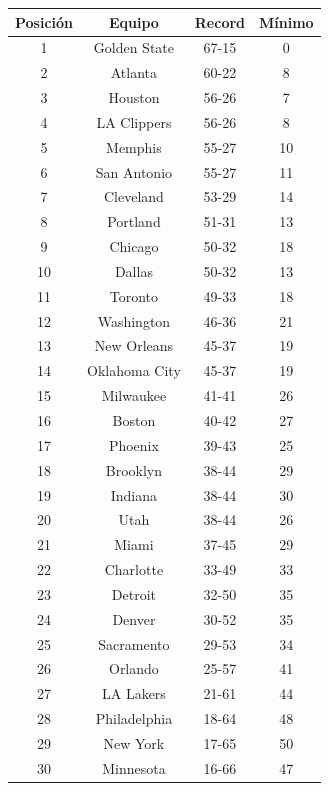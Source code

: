 {\centering
\begin{tabular}{|c|c|c|c|}
\hline
Posici\'on & Equipo & Record & M\'inimo\\
\hline
1 & Golden State & 67-15 & 0 \\
\hline
2 & Atlanta & 60-22 & 8 \\
\hline
3 & Houston & 56-26 & 7 \\
\hline
4 & LA Clippers & 56-26 & 8 \\
\hline
5 & Memphis & 55-27 & 10 \\
\hline
6 & San Antonio & 55-27 & 11 \\
\hline
7 & Cleveland & 53-29 & 14 \\
\hline
8 & Portland & 51-31 & 13 \\
\hline
9 & Chicago & 50-32 & 18 \\
\hline
10 & Dallas & 50-32 & 13 \\
\hline
11 & Toronto & 49-33 & 18 \\
\hline
12 & Washington & 46-36 & 21 \\
\hline
13 & New Orleans & 45-37 & 19 \\
\hline
14 & Oklahoma City & 45-37 & 19 \\
\hline
15 & Milwaukee & 41-41 & 26 \\
\hline
16 & Boston & 40-42 & 27 \\
\hline
17 & Phoenix & 39-43 & 25 \\
\hline
18 & Brooklyn & 38-44 & 29 \\
\hline
19 & Indiana & 38-44 & 30 \\
\hline
20 & Utah & 38-44 & 26 \\
\hline
21 & Miami & 37-45 & 29 \\
\hline
22 & Charlotte & 33-49 & 33 \\
\hline
23 & Detroit & 32-50 & 35 \\
\hline
24 & Denver & 30-52 & 35 \\
\hline
25 & Sacramento & 29-53 & 34 \\
\hline
26 & Orlando & 25-57 & 41 \\
\hline
27 & LA Lakers & 21-61 & 44 \\
\hline
28 & Philadelphia & 18-64 & 48 \\
\hline
29 & New York & 17-65 & 50 \\
\hline
30 & Minnesota & 16-66 & 47 \\
\hline
\end{tabular} \\ }

